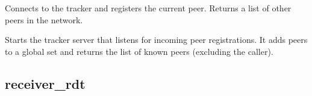 \documentclass[letterpaper,10pt,oneside,english,openany]{sphinxmanual}
\begin{document}
\begin{fulllineitems}
\label{\detokenize{modules:p2p_command.register_with_tracker}}
\pysigstartsignatures
\pysiglinewithargsret
{}
{\sphinxparamcomma {}\sphinxparamcomma {}\sphinxparamcomma {}\sphinxparamcomma {}}
{}
\pysigstopsignatures
\sphinxAtStartPar
Connects to the tracker and registers the current peer.
Returns a list of other peers in the network.

\end{fulllineitems}


\begin{fulllineitems}
\label{\detokenize{modules:p2p_command.start_tracker}}
\pysigstartsignatures
\pysiglinewithargsret
{}
{\sphinxparamcomma {}}
{}
\pysigstopsignatures
\sphinxAtStartPar
Starts the tracker server that listens for incoming peer registrations.
It adds peers to a global set and returns the list of known peers (excluding the caller).

\end{fulllineitems}



\subsection{receiver\_rdt}
\label{\detokenize{modules:module-receiver_rdt}}\label{\detokenize{modules:receiver-rdt}}
\end{document}
